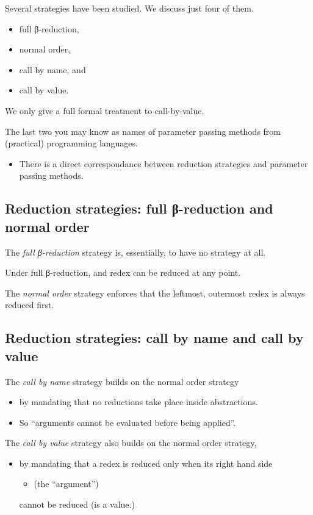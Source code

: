 \documentclass[11pt]{article}
\theoremstyle{definition}
\begin{document}
Several strategies have been studied. We discuss just four of them.
\begin{itemize}
\item full β-reduction,
\item normal order,
\item call by name, and
\item call by value.
\end{itemize}
We only give a full formal treatment to call-by-value.

The last two you may know as names of parameter passing methods
from (practical) programming languages.
\begin{itemize}
\item There is a direct correspondance between reduction strategies
and parameter passing methods.
\end{itemize}

\subsection{Reduction strategies: full β-reduction and normal order}
\label{sec:org474d3f5}
The \emph{full β-reduction} strategy is, essentially, to have no
strategy at all.

Under full β-reduction, and redex can be reduced at any point.

The \emph{normal order} strategy enforces that the
leftmost, outermost redex is always reduced first.

\subsection{Reduction strategies: call by name and call by value}
\label{sec:org5f24e5d}
The \emph{call by name} strategy builds on the normal order strategy
\begin{itemize}
\item by mandating that no reductions take place inside abstractions.
\item So “arguments cannot be evaluated before being applied”.
\end{itemize}

The \emph{call by value} strategy also builds on the normal order strategy,
\begin{itemize}
\item by mandating that a redex is reduced only when its right hand side
\begin{itemize}
\item (the “argument”)
\end{itemize}
cannot be reduced (is a value.)
\end{itemize}
\end{document}
